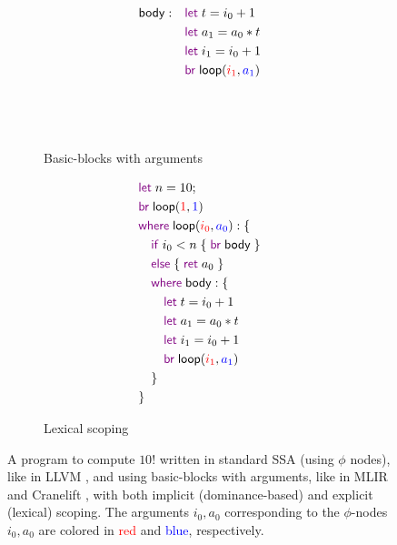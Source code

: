 \documentclass[acmsmall,screen,review]{acmart}
\newcommand{\ms}[1]{\ensuremath{\mathsf{#1}}}
\newcommand{\kwms}[1]{\textcolor{violet}{\ms{#1}}}
\newcommand{\lbms}[1]{{\ms{#1}}}
\begin{document}
\begin{figure}
\begin{subfigure}[t]{.35\textwidth}
\begin{adjustbox}{minipage=1.2\textwidth,scale=0.8}
\begin{align*}
      \lbms{body}: \quad            & \kwms{let}\;t = i_0 + 1 \\
                                    & \kwms{let}\;a_1 = a_0 * t \\
                                    & \kwms{let}\;i_1 = i_0 + 1 \\
                                    & \kwms{br}\;\lbms{loop}
                                      (\textcolor{red}{i_1}, \textcolor{blue}{a_1}) 
                                    \\ \\ \\ \\
    \end{align*}
    \end{adjustbox}
    \caption{Basic-blocks with arguments}
    \label{fig:fact-bba}
  \end{subfigure}%
  \begin{subfigure}[t]{.3\textwidth}
    \begin{adjustbox}{minipage=\linewidth,scale=0.8}
    \begin{align*}
      & \kwms{let}\;n = 10; \\
      & \kwms{br}\;\lbms{loop}(\textcolor{red}{1}, \textcolor{blue}{1}) \\
      & \kwms{where}\;\lbms{loop}(\textcolor{red}{i_0}, \textcolor{blue}{a_0}): \{ \\
      & \quad \kwms{if}\;i_0 < n\;\{\;\kwms{br}\;\lbms{body}\;\} \\
      & \quad \kwms{else}\;\{\;\kwms{ret}\;a_0\;\} \\
      & \quad \kwms{where}\;\lbms{body}: \{\\ 
      & \qquad \kwms{let}\;t = i_0 + 1 \\
      & \qquad \kwms{let}\;a_1 = a_0 * t \\
      & \qquad \kwms{let}\;i_1 = i_0 + 1 \\
      & \qquad \kwms{br}\;\lbms{loop}(\textcolor{red}{i_1}, \textcolor{blue}{a_1})  \\
      & \quad \} \\
      & \}
    \end{align*}
    \end{adjustbox}
    \caption{Lexical scoping}
    \label{fig:fact-lex}
  \end{subfigure}
  
  \caption{%
    A program to compute $10!$ written in standard SSA (using $\phi$ nodes), like in LLVM
    \cite{llvm}, and using basic-blocks with arguments, like in MLIR \cite{mlir} and Cranelift
    \cite{cranelift}, with both implicit (dominance-based) and explicit (lexical) scoping. The
    arguments $i_0, a_0$ corresponding to the $\phi$-nodes $i_0, a_0$ are colored in
    \textcolor{red}{red} and \textcolor{blue}{blue}, respectively.%
  }
  \Description{}
\end{figure}
\end{document}
